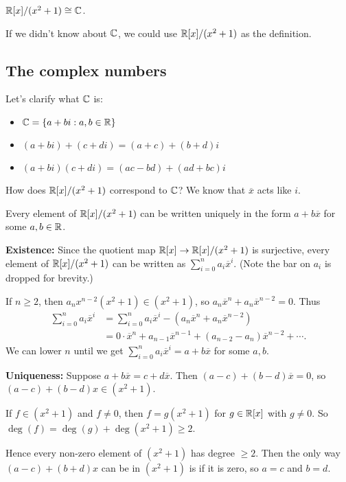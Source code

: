 \documentclass[12pt,letterpaper]{report}
\begin{document}
\begin{thm}{}{}
  $\mathbb{R}[x]/(x^2 + 1) \cong \mathbb{C}$.
\end{thm}

If we didn't know about $\mathbb{C}$, we could use $\mathbb{R}[x]/(x^2 + 1)$ as the definition.

\pagebreak
\subsection{The complex numbers}

Let's clarify what $\mathbb{C}$ is:
\begin{itemize}
  \item $\mathbb{C} = \{a + bi : a, b \in \mathbb{R}\}$
  \item $(a + bi) + (c + di) = (a + c) + (b + d)i$
  \item $(a + bi)(c + di) = (ac - bd) + (ad + bc)i$
\end{itemize}

How does $\mathbb{R}[x]/(x^2 + 1)$ correspond to $\mathbb{C}$?
We know that $\overline{x}$ acts like $i$.

\begin{lem}{}{}
  Every element of $\mathbb{R}[x]/(x^2 + 1)$ can be written uniquely in the form $a + b\overline{x}$ for
  some $a, b \in \mathbb{R}$.
\end{lem}

\begin{thmproof}
  \textbf{Existence:}
  Since the quotient map $\mathbb{R}[x] \to \mathbb{R}[x]/(x^2 + 1)$ is surjective, every element of
  $\mathbb{R}[x]/(x^2 + 1)$ can be written as $\sum_{i = 0}^n a_i \overline{x}^i$.
  (Note the bar on $a_i$ is dropped for brevity.)

  If $n \geq 2$, then $a_n x^{n - 2}(x^2 + 1) \in (x^2 + 1)$, so
  $a_n \overline{x}^n + a_n \overline{x}^{n - 2} = 0$.
  Thus
  \begin{align*}
    \sum_{i = 0}^n a_i \overline{x}^i
    &= \sum_{i = 0}^{n} a_i \overline{x}^i - (a_n \overline{x}^n + a_n \overline{x}^{n - 2}) \\
    &= 0 \cdot \overline{x}^n + a_{n - 1} \overline{x}^{n - 1}
      + (a_{n - 2} - a_n) \overline{x}^{n - 2} + \cdots.
  \end{align*}
  We can lower $n$ until we get $\sum_{i = 0}^n a_i \overline{x}^i = a + b\overline{x}$ for some
  $a, b$.

  \textbf{Uniqueness:}
  Suppose $a + b\overline{x} = c + d\overline{x}$.
  Then $(a - c) + (b - d)\overline{x} = 0$, so $(a - c) + (b - d)x \in (x^2 + 1)$.

  If $f \in (x^2 + 1)$ and $f \neq 0$, then $f = g(x^2 + 1)$ for $g \in \mathbb{R}[x]$ with $g \neq 0$.
  So $\deg(f) = \deg(g) + \deg(x^2 + 1) \geq 2$.

  Hence every non-zero element of $(x^2 + 1)$ has degree $\geq 2$.
  Then the only way $(a - c) + (b + d)x$ can be in $(x^2 + 1)$ is if it is zero, so
  $a = c$ and $b = d$.
\end{thmproof}
\end{document}
